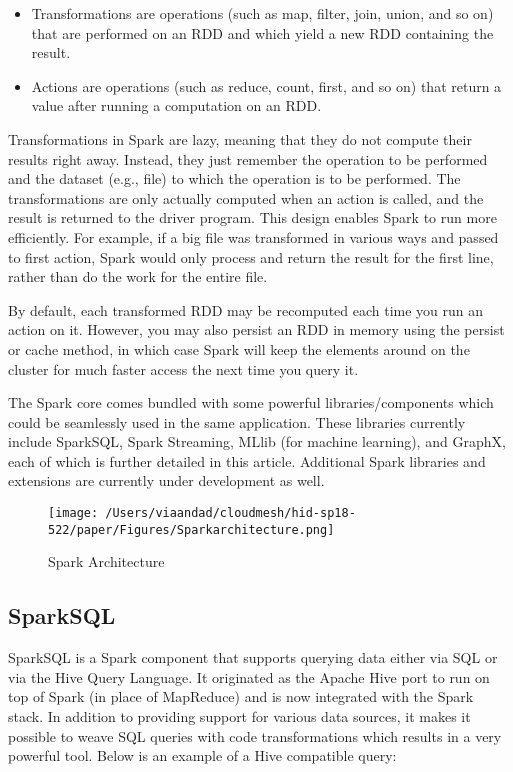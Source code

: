 \documentclass{paper}
\begin{document}
\begin{itemize}
   \item  Transformations are operations (such as map, filter, join, union, and so on) that are performed 		on an RDD and which yield a new RDD containing the result.
   \item  Actions are operations (such as reduce, count, first, and so on) that return a value after running a 		computation on an RDD.
\end{itemize}

Transformations in Spark are lazy, meaning that they do not compute their results right away. Instead, they just remember the operation to be performed and the dataset (e.g., file) to which the operation is to be performed. The transformations are only actually computed when an action is called, and the result is returned to the driver program. This design enables Spark to run more efficiently. For example, if a big file was transformed in various ways and passed to first action, Spark would only process and return the result for the first line, rather than do the work for the entire file.\cite{ref:topal} \hfill\break

By default, each transformed RDD may be recomputed each time you run an action on it. However, you may also persist an RDD in memory using the persist or cache method, in which case Spark will keep the elements around on the cluster for much faster access the next time you query it.\cite{ref:topal}\hfill\break

The Spark core comes bundled with some powerful libraries/components which could be seamlessly used in the same application. These libraries currently include SparkSQL, Spark Streaming, MLlib (for machine learning), and GraphX, each of which is further detailed in this article. Additional Spark libraries and extensions are currently under development as well.\cite{ref:topal}\hfill\break


\begin{figure}[H]
	\centering
	\texttt{[image: /Users/viaandad/cloudmesh/hid-sp18-522/paper/Figures/Sparkarchitecture.png]}
	\caption[Optional caption]{Spark Architecture}
	\label{fig:sparkfeatures}
\end{figure}

\subsection{SparkSQL}
SparkSQL is a Spark component that supports querying data either via SQL or via the Hive Query Language. It originated as the Apache Hive port to run on top of Spark (in place of MapReduce) and is now integrated with the Spark stack. In addition to providing support for various data sources, it makes it possible to weave SQL queries with code transformations which results in a very powerful tool. Below is an example of a Hive compatible query:\cite{ref:topal}\hfill\break
\end{document}
